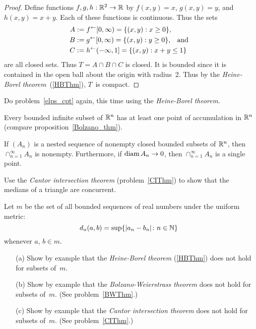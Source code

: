 \begin{proof} Define functions $f,g,h: \mathbb{R}^2 \rightarrow \mathbb{R}$ by $f(x,y) = x$, $g(x,y) = y$, and $h(x,y)
= x + y$. Each of these functions is continuous. Thus the sets
 \begin{align*}
     A &:= f^{\gets}[0,\infty) = \{(x,y) : x \ge 0\}, \\
     B &:= g^{\gets}[0,\infty) = \{(x,y) : y \ge 0\}\text{,\quad
                       and} \\
     C &:= h^{\gets}(-\infty,1] = \{(x,y) : x+y \le 1\}
 \end{align*}
are all closed sets. Thus $T = A \cap B \cap C$ is closed. It is bounded since it is contained
in the open ball about the origin with radius~2.  Thus by the \emph{Heine-Borel
theorem}~(\ref{HBThm}), $T$~is compact.
\end{proof}

\begin{prob} Do problem~\ref{elps_cpt} again, this time using the \emph{Heine-Borel theorem}.
\end{prob}

%
\begin{prob}\label{BWThm} Every bounded infinite subset of $\mathbb{R}^n$
has at least one point of accumulation in $\mathbb{R}^n$ (compare proposition~\ref{Bolzano_thm}).
\end{prob}

\begin{prob}\label{CIThm} If $(A_n)$ is a nested sequence of
nonempty closed bounded subsets of $\mathbb{R}^n$, then $\cap_{n=1}^{\infty}A_n$ is nonempty.
Furthermore, if $\operatorname{diam} A_n \rightarrow 0$, then $\cap_{n=1}^{\infty}A_n$ is a single point.
\end{prob}

\begin{prob} Use the \emph{Cantor intersection theorem} (problem~\ref{CIThm}) to show that the
medians of a triangle are concurrent.
\end{prob}

\begin{prob}\label{cpt_prb3} Let $m$ be the set of all bounded sequences of real numbers under
the uniform metric:
   \[ d_u(a,b) = \sup \{\lvert a_n - b_n\rvert \colon n \in \mathbb{N}\} \]
whenever $a$, $b \in m$.
 \begin{enumerate}
  \item[(a)] Show by example that the \emph{Heine-Borel theorem} (\ref{HBThm}) does not hold for
subsets of~$m$.
  \item[(b)] Show by example that the \emph{Bolzano-Weierstrass theorem} does not hold for subsets
of~$m$. (See problem~\ref{BWThm}.)
  \item[(c)] Show by example that the \emph{Cantor intersection theorem} does not hold for subsets
of~$m$. (See problem~\ref{CIThm}.)
 \end{enumerate}
\end{prob}

